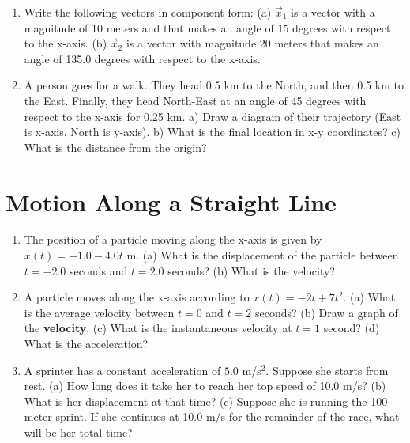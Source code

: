 \documentclass[10pt]{article}
\begin{document}
\begin{enumerate}
\item Write the following vectors in component form: (a) $\vec{x}_1$ is a vector with a magnitude of 10 meters and that makes an angle of 15 degrees with respect to the x-axis. (b) $\vec{x}_2$ is a vector with magnitude 20 meters that makes an angle of 135.0 degrees with respect to the x-axis.  \\ \vspace{2.0cm}
\item A person goes for a walk.  They head 0.5 km to the North, and then 0.5 km to the East.  Finally, they head North-East at an angle of 45 degrees with respect to the x-axis for 0.25 km.  a) Draw a diagram of their trajectory (East is x-axis, North is y-axis). b) What is the final location in x-y coordinates? c) What is the distance from the origin? \\ \vspace{3cm}
\end{enumerate}

\section{Motion Along a Straight Line}

\begin{enumerate}
\item The position of a particle moving along the x-axis is given by $x(t) = -1.0 - 4.0t$ m. (a) What is the displacement of the particle between $t=-2.0$ seconds and $t=2.0$ seconds?  (b) What is the velocity? \\ \vspace{1.5cm}
\item A particle moves along the x-axis according to $x(t) = -2t + 7t^2$.  (a) What is the average velocity between $t=0$ and $t=2$ seconds?  (b) Draw a graph of the \textbf{velocity}.  (c) What is the instantaneous velocity at $t=1$ second?  (d) What is the acceleration? \\ \vspace{3cm}
\item A sprinter has a constant acceleration of $5.0$ m/s$^2$.  Suppose she starts from rest.  (a) How long does it take her to reach her top speed of 10.0 m/s? (b) What is her displacement at that time?  (c) Suppose she is running the 100 meter sprint.  If she continues at 10.0 m/s for the remainder of the race, what will be her total time? \\ \vspace{3cm}
\end{enumerate}
\end{document}

